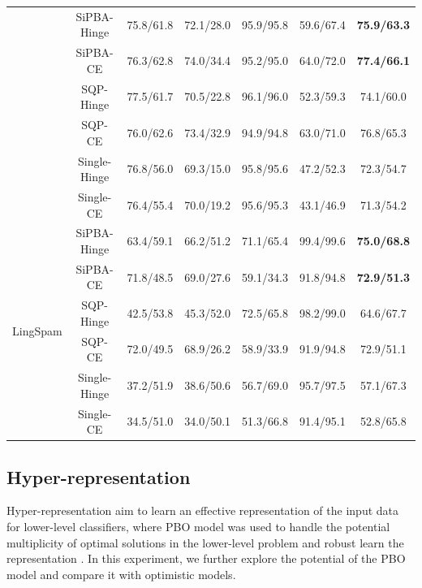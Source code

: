 \documentclass{article}
\begin{document}
\begin{table}[htbp]
{\begin{tabular}{ccccccc}
            & SiPBA-Hinge & 75.8/61.8 & 72.1/28.0 & 95.9/95.8 & 59.6/67.4 & \textbf{75.9/63.3} \\
            & SiPBA-CE & 76.3/62.8 & 74.0/34.4 & 95.2/95.0 & 64.0/72.0 & \textbf{77.4/66.1} \\
            & SQP-Hinge & 77.5/61.7 & 70.5/22.8 & 96.1/96.0 & 52.3/59.3 & 74.1/60.0 \\
            & SQP-CE & 76.0/62.6 & 73.4/32.9 & 94.9/94.8 & 63.0/71.0 & 76.8/65.3 \\
            & Single-Hinge & 76.8/56.0 & 69.3/15.0 & 95.8/95.6 & 47.2/52.3 & 72.3/54.7 \\
            & Single-CE & 76.4/55.4 & 70.0/19.2 & 95.6/95.3 & 43.1/46.9 & 71.3/54.2 \\
            \midrule
            \multirow{6}{*}{LingSpam}
            & SiPBA-Hinge & 63.4/59.1 & 66.2/51.2 & 71.1/65.4 & 99.4/99.6 & \textbf{75.0/68.8} \\
            & SiPBA-CE & 71.8/48.5 & 69.0/27.6 & 59.1/34.3 & 91.8/94.8 & \textbf{72.9/51.3} \\
            
            & SQP-Hinge & 42.5/53.8 & 45.3/52.0 & 72.5/65.8 & 98.2/99.0 & 64.6/67.7 \\
            & SQP-CE & 72.0/49.5 & 68.9/26.2 & 58.9/33.9 & 91.9/94.8 & 72.9/51.1 \\
            & Single-Hinge & 37.2/51.9 & 38.6/50.6 & 56.7/69.0 & 95.7/97.5 & 57.1/67.3 \\
            & Single-CE & 34.5/51.0 & 34.0/50.1 & 51.3/66.8 & 91.4/95.1 & 52.8/65.8 \\
            \bottomrule
        \end{tabular}\label{mutual_training_results}
    }
    \vspace{-1em}
\end{table}


\subsection{Hyper-representation}
Hyper-representation\cite{grazzi2020iteration, franceschi2018bilevel} aim to learn an effective representation of the input data for lower-level classifiers, where PBO model was used to handle the potential multiplicity of optimal solutions in the lower-level problem and robust learn the representation \cite{guanadaprox}. In this experiment, we further explore the potential of the PBO model and compare it with optimistic models.
\end{document}
